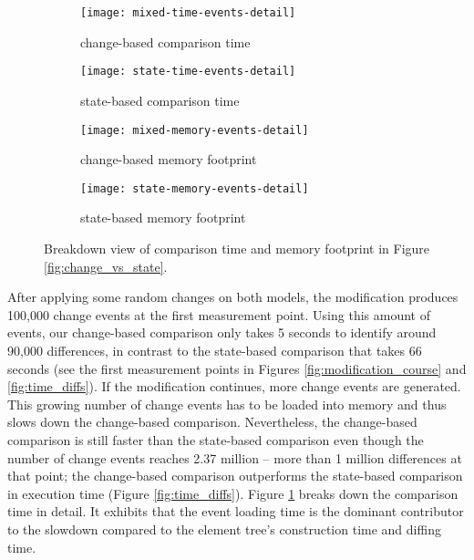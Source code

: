 \begin{figure}[ht]
    \centering
    \begin{subfigure}[t]{0.495\linewidth}
        \texttt{[image: mixed-time-events-detail]}
        \caption{change-based comparison time}
        \label{fig:time_changediff_detail}
    \end{subfigure}
    \hfill
    \begin{subfigure}[t]{0.495\linewidth}
        \texttt{[image: state-time-events-detail]}
        \caption{state-based comparison time}
        \label{fig:time_statediff_detail}
    \end{subfigure}
    \begin{subfigure}[t]{0.495\linewidth}
        \texttt{[image: mixed-memory-events-detail]}
        \caption{change-based memory footprint}
        \label{fig:memory_changediff_detail}
    \end{subfigure}
    \hfill
    \begin{subfigure}[t]{0.495\linewidth}
        \texttt{[image: state-memory-events-detail]}
        \caption{state-based memory footprint}
        \label{fig:memory_statediff_detail}
    \end{subfigure}
    \caption{Breakdown view of comparison time and memory footprint in Figure \ref{fig:change_vs_state}.}
    \label{fig:time_memory_detail}
\end{figure}

After applying some random changes on both models, the modification produces 100,000 change events at the first measurement point. Using this amount of events, our change-based comparison only takes 5 seconds to identify around 90,000 differences, in contrast to the state-based comparison that takes 66 seconds (see the first measurement points in Figures \ref{fig:modification_course} and \ref{fig:time_diffs}). If the modification continues, more change events are generated. This growing number of change events has to be loaded into memory and thus slows down the change-based comparison. Nevertheless, the change-based comparison is still faster than the state-based comparison even though the number of change events reaches 2.37 million -- more than 1 million differences at that point; the change-based comparison outperforms the state-based comparison in execution time (Figure \ref{fig:time_diffs}). Figure \ref{fig:time_changediff_detail} breaks down the comparison time in detail. It exhibits that the event loading time is the dominant contributor to the slowdown compared to the element tree's construction time and diffing time. 

